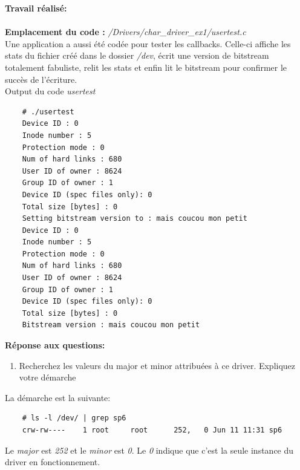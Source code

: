 \textbf{Travail réalisé: }\\\\ 
\textbf{Emplacement du code : }\textit{/Drivers/char\_driver\_ex1/usertest.c}\\
Une application a aussi été codée pour tester les callbacks. Celle-ci affiche les stats du fichier créé dans le dossier \textit{/dev}, écrit une version de bitstream totalement fabuliste, relit les stats et enfin lit le bitstream pour confirmer le succès de l'écriture.\\
Output du code \textit{usertest}
\begin{lstlisting}
	# ./usertest 
	Device ID : 0
	Inode number : 5
	Protection mode : 0
	Num of hard links : 680
	User ID of owner : 8624
	Group ID of owner : 1
	Device ID (spec files only): 0
	Total size [bytes] : 0
	Setting bitstream version to : mais coucou mon petit                                                          
	Device ID : 0
	Inode number : 5
	Protection mode : 0
	Num of hard links : 680
	User ID of owner : 8624
	Group ID of owner : 1
	Device ID (spec files only): 0
	Total size [bytes] : 0
	Bitstream version : mais coucou mon petit  
\end{lstlisting}
\textbf{Réponse aux questions: }
\begin{enumerate}
	\item Recherchez les valeurs du major et minor attribuées à ce driver. Expliquez votre démarche\\
\end{enumerate}
La démarche est la suivante:
\begin{lstlisting}
	# ls -l /dev/ | grep sp6
	crw-rw----    1 root     root      252,   0 Jun 11 11:31 sp6
\end{lstlisting}
Le \textit{major} est \textit{252} et le \textit{minor} est \textit{0}. Le \textit{0} indique que c'est la seule instance du driver en fonctionnement.


